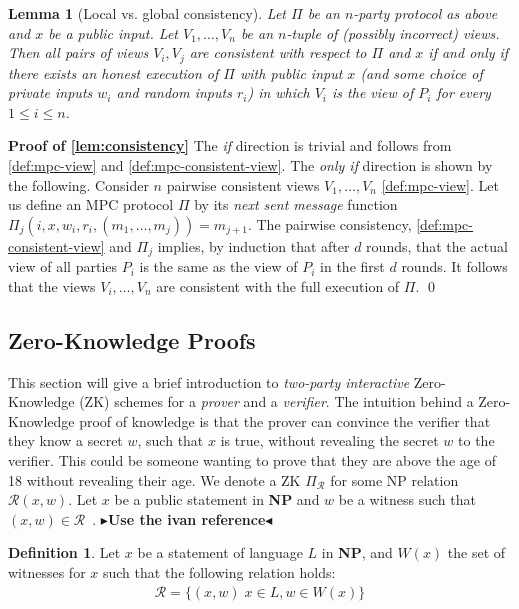 \documentclass[twoside,11pt]{report}
\theoremstyle{definition}
\newtheorem{definition}{Definition}[section]
\theoremstyle{plain}
\newtheorem{lemma}{Lemma}[section]
\newcommand{\todo}[1]{{\color[rgb]{.5,0,0}\textbf{$\blacktriangleright$#1$\blacktriangleleft$}}}
\begin{document}
\begin{lemma}[Local vs. global consistency]\label{lem:consistency}
  Let $\Pi$ be an $n$-party protocol as above and $x$ be a public input.
  Let $V_1, \dots, V_n$ be an $n$-tuple of (possibly incorrect) views. Then all pairs of views $V_i, V_j$ are consistent with respect to $\Pi$ and $x$ if and only if there exists an honest execution of $\Pi$ with public input $x$ (and some choice of private inputs $w_i$ and random inputs $r_i$) in which $V_i$ is the view of $P_i$ for every $1 \leq i \leq n$.
\end{lemma}

\textbf{Proof of \autoref{lem:consistency}} The \textit{if} direction is trivial and follows from \autoref{def:mpc-view} and \autoref{def:mpc-consistent-view}.
The \textit{only if} direction is shown by the following. Consider $n$ pairwise consistent views $V_1, \dots, V_n$ \autoref{def:mpc-view}. Let us define an MPC protocol $\Pi$ by its \textit{next sent message} function $\Pi_j(i,x,w_i,r_i, (m_1, \dots, m_j)) = m_{j+1}$. The pairwise consistency, \autoref{def:mpc-consistent-view} and $\Pi_j$ implies, by induction that after $d$ rounds, that the actual view of all parties $P_i$ is the same as the view of $P_i$ in the first $d$ rounds. It follows that the views $V_i, \dots, V_n$ are consistent with the full execution of $\Pi$. \qed

\subsection{Zero-Knowledge Proofs}\label{sec:zk}
This section will give a brief introduction to \textit{two-party interactive} Zero-Knowledge (ZK) schemes for a \textit{prover} and a \textit{verifier}. The intuition behind a Zero-Knowledge proof of knowledge is that the prover can convince the verifier that they know a secret $w$, such that $x$ is true, without revealing the secret $w$ to the verifier. This could be someone wanting to prove that they are above the age of 18 without revealing their age. We denote a ZK $\Pi_{\mathcal{R}}$ for some NP relation $\mathcal{R}(x, w)$. Let $x$ be a public statement in \textbf{NP} and $w$ be a witness such that $(x, w) \in \mathcal{R}$~\cite{feneuil2023threshold}.
\todo{Use the ivan reference}

\begin{definition}
  Let $x$ be a statement of language $L$ in \textbf{NP}, and $W(x)$ the set of witnesses for $x$ such that the following relation holds:
  \begin{align*}
    \mathcal{R} = \{(x, w)\; x \in L, w \in W(x)\}
  \end{align*}
\end{definition}
\end{document}
